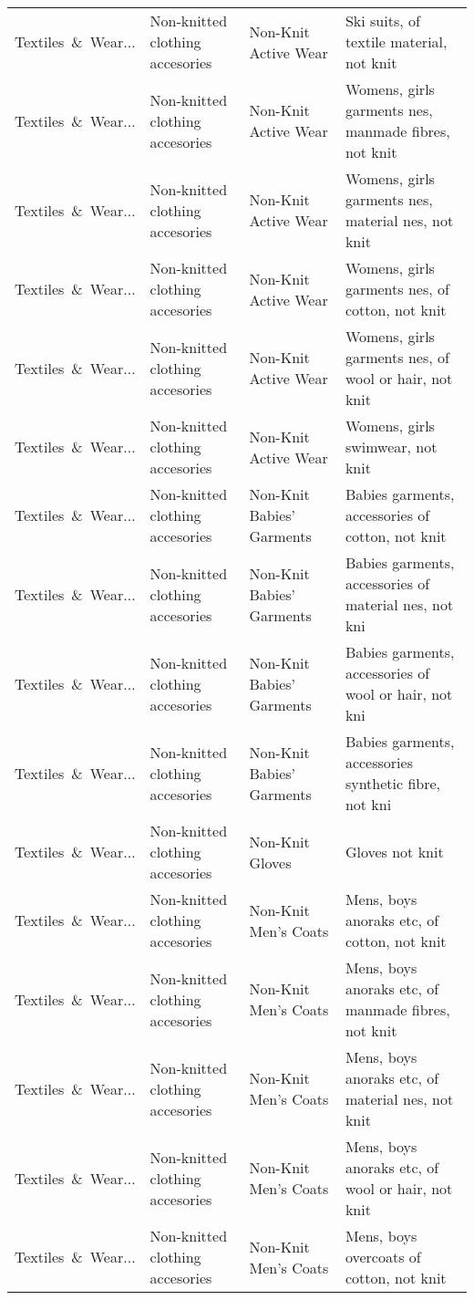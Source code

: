 \begin{appendices}
\begin{xltabular}{\textwidth}{|p{0.10\textwidth}|p{0.25\textwidth}|p{0.24\textwidth}|p{0.31\textwidth}|}
Textiles\ \&\ Wear... & Non-knitted clothing accesories & Non-Knit Active Wear & Ski suits, of textile material, not knit \\
Textiles\ \&\ Wear... & Non-knitted clothing accesories & Non-Knit Active Wear & Womens, girls garments nes, manmade fibres, not knit \\
Textiles\ \&\ Wear... & Non-knitted clothing accesories & Non-Knit Active Wear & Womens, girls garments nes, material nes, not knit \\
Textiles\ \&\ Wear... & Non-knitted clothing accesories & Non-Knit Active Wear & Womens, girls garments nes, of cotton, not knit \\
Textiles\ \&\ Wear... & Non-knitted clothing accesories & Non-Knit Active Wear & Womens, girls garments nes, of wool or hair, not knit \\
Textiles\ \&\ Wear... & Non-knitted clothing accesories & Non-Knit Active Wear & Womens, girls swimwear, not knit \\
Textiles\ \&\ Wear... & Non-knitted clothing accesories & Non-Knit Babies' Garments & Babies garments, accessories of cotton, not knit \\
Textiles\ \&\ Wear... & Non-knitted clothing accesories & Non-Knit Babies' Garments & Babies garments, accessories of material nes, not kni \\
Textiles\ \&\ Wear... & Non-knitted clothing accesories & Non-Knit Babies' Garments & Babies garments, accessories of wool or hair, not kni \\
Textiles\ \&\ Wear... & Non-knitted clothing accesories & Non-Knit Babies' Garments & Babies garments, accessories synthetic fibre, not kni \\
Textiles\ \&\ Wear... & Non-knitted clothing accesories & Non-Knit Gloves & Gloves not knit \\
Textiles\ \&\ Wear... & Non-knitted clothing accesories & Non-Knit Men's Coats & Mens, boys anoraks etc, of cotton, not knit \\
Textiles\ \&\ Wear... & Non-knitted clothing accesories & Non-Knit Men's Coats & Mens, boys anoraks etc, of manmade fibres, not knit \\
Textiles\ \&\ Wear... & Non-knitted clothing accesories & Non-Knit Men's Coats & Mens, boys anoraks etc, of material nes, not knit \\
Textiles\ \&\ Wear... & Non-knitted clothing accesories & Non-Knit Men's Coats & Mens, boys anoraks etc, of wool or hair, not knit \\
Textiles\ \&\ Wear... & Non-knitted clothing accesories & Non-Knit Men's Coats & Mens, boys overcoats of cotton, not knit \\

\end{xltabular}
\end{appendices}
